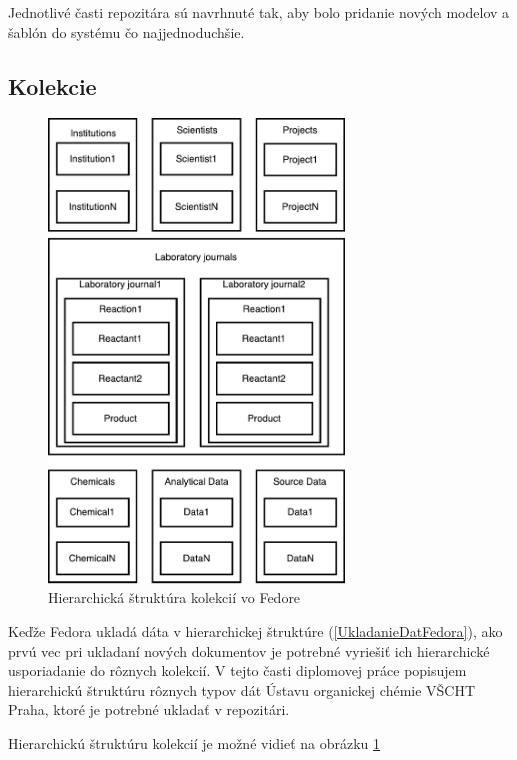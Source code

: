 \documentclass[thesis=M,slovak]{FITthesis}[2013/05/06]
\begin{document}
Jednotlivé časti repozitára sú navrhnuté tak, aby bolo pridanie nových modelov a šablón do systému čo najjednoduchšie.

\subsection{Kolekcie}

\begin{figure}[h]\centering
	\includegraphics[width=0.7\textwidth]{diagramy/Collections_Diagram.pdf}
 	\caption[Hierarchická štruktúra kolekcií vo Fedore]{Hierarchická štruktúra kolekcií vo Fedore}\label{graphics:CollectionsDiagram}
\end{figure}

Keďže Fedora ukladá dáta v hierarchickej štruktúre (\ref{UkladanieDatFedora}), ako prvú vec pri ukladaní nových dokumentov je potrebné vyriešiť ich hierarchické usporiadanie do rôznych kolekcií. V tejto časti diplomovej práce popisujem hierarchickú štruktúru rôznych typov dát Ústavu organickej chémie VŠCHT Praha, ktoré je potrebné ukladať v repozitári.

Hierarchickú štruktúru kolekcií je možné vidieť na obrázku \ref{graphics:CollectionsDiagram}
\end{document}
